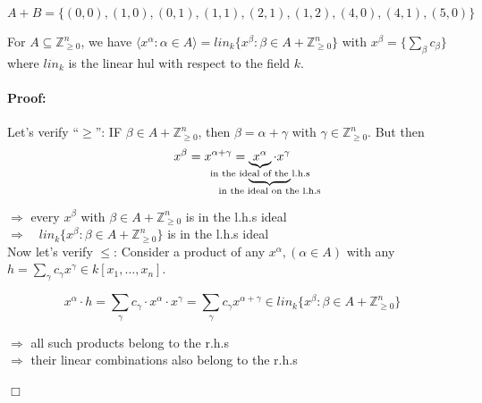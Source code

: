 \begin{example}[title = Example]
\begin{center}
\[A + B = \{(0,0), (1,0), (0,1), (1,1), (2,1), (1,2), (4,0), (4,1), (5,0)\}\]
\end{center}
\end{example} 


\begin{lemma}[title = Lemma 2.3.5]
    For $A \subseteq \mathbb{Z}^n_{\geq 0}$, we have $\langle x^{\alpha}: \alpha \in A \rangle = lin_k \{x^{\beta}: \beta \in A + \mathbb{Z}^n_{\geq 0}\}$ with $x^{\beta} = \{\sum_{\beta}c_{\beta} \}$ %
    where $lin_k$ is the linear hul with respect to the field $k$.  
    
    \paragraph{Proof:} Let's verify \enquote{$\geq$}: IF $\beta \in A + \mathbb{Z}^n_{\geq 0}$, then $\beta  = \alpha + \gamma$ with $\gamma \in \mathbb{Z}^n_{\geq 0}$. 
    But then 
    \[x^{\beta} = x^{\alpha + \gamma} = \underbrace{\underbrace{x^{\alpha}}_{\mathclap{\text{in the ideal of the l.h.s}}} \cdot x^{\gamma}}_{\mathclap{\text{in the ideal on the l.h.s}}}\]

    $\Rightarrow$ every $x^{\beta}$ with $\beta \in A + \mathbb{Z}^n_{\geq 0}$ is in the l.h.s ideal \\
    $\Rightarrow \quad lin_k \{x^{\beta}: \beta \in A + \mathbb{Z}^n_{\geq 0}\}$ is in the l.h.s ideal \\[0.5em]
    Now let's verify $\leq$: Consider a product of any $x^{\alpha}, (\alpha \in A)$ with any $h = \sum_{\gamma} c_{\gamma} x^{\gamma} \in k[x_1, \dots, x_n]$.

    \[x^{\alpha} \cdot h = \sum_{\gamma} c_{\gamma} \cdot x^{\alpha} \cdot x^{\gamma} = \sum_{\gamma} c_{\gamma} x^{\alpha + \gamma} \in lin_k \{x^{\beta}: \beta \in A + \mathbb{Z}^n_{\geq 0}\}\]

    $\Rightarrow$ all such products belong to the r.h.s \\
    $\Rightarrow$ their linear combinations also belong to the r.h.s \\
      \begin{flushright}
        $\Box $
      \end{flushright}
\end{lemma}

